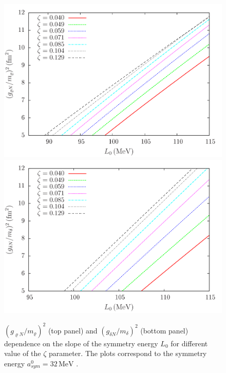 \documentclass[twocolumn,showpacs,aps]{revtex4}
\begin{document}
\begin{figure}[ht]
\centering
   \includegraphics[width=9.cm]{grL0_lambda_a32.png}
    \centering
   \includegraphics[width=9.cm]{gdL0_lambda_a32.png}
 \caption{\label{gdL0_lambda} $(g_{\varrho N}/m_{\varrho})^2$ (top panel) and $(g_{\delta N}/m_{\delta})^2$ (bottom panel)
 dependence on the slope of the symmetry energy $L_0$ for 
  different value of the $\zeta$ parameter. 
  The plots correspond to the symmetry energy $a_{sym}^0=32\, \mathrm{MeV}$
 .}
 \end{figure}
\end{document}
